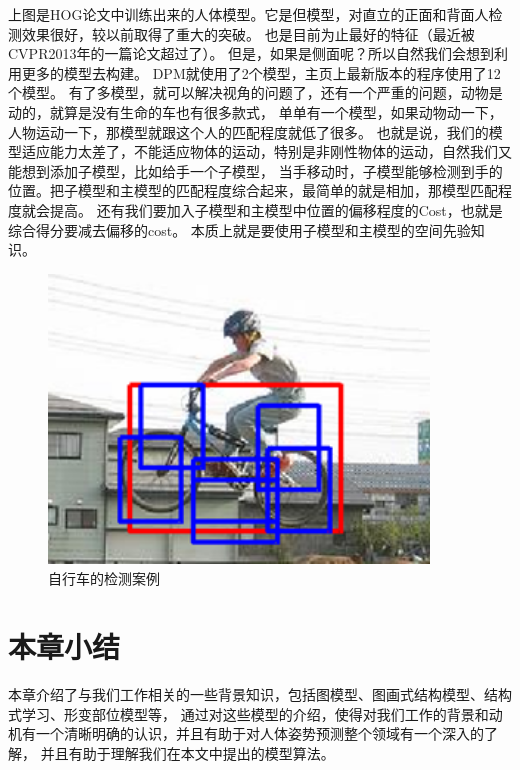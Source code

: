 上图是HOG论文中训练出来的人体模型。它是但模型，对直立的正面和背面人检测效果很好，较以前取得了重大的突破。
也是目前为止最好的特征（最近被CVPR2013年的一篇论文\cite{hsc}超过了）。
但是，如果是侧面呢？所以自然我们会想到利用更多的模型去构建。
DPM就使用了2个模型，主页上最新版本的程序使用了12个模型。
有了多模型，就可以解决视角的问题了，还有一个严重的问题，动物是动的，就算是没有生命的车也有很多款式，
单单有一个模型，如果动物动一下，人物运动一下，那模型就跟这个人的匹配程度就低了很多。
也就是说，我们的模型适应能力太差了，不能适应物体的运动，特别是非刚性物体的运动，自然我们又能想到添加子模型，比如给手一个子模型，
当手移动时，子模型能够检测到手的位置。把子模型和主模型的匹配程度综合起来，最简单的就是相加，那模型匹配程度就会提高。
还有我们要加入子模型和主模型中位置的偏移程度的Cost，也就是综合得分要减去偏移的cost。
本质上就是要使用子模型和主模型的空间先验知识。

\begin{figure}
\centering
\includegraphics[width=0.9\textwidth]{img/dpm1.png}
\caption{自行车的检测案例}
\label{fig:dpm1}
\end{figure}

\section{本章小结}
本章介绍了与我们工作相关的一些背景知识，包括图模型、图画式结构模型、结构式学习、形变部位模型等，
通过对这些模型的介绍，使得对我们工作的背景和动机有一个清晰明确的认识，并且有助于对人体姿势预测整个领域有一个深入的了解，
并且有助于理解我们在本文中提出的模型算法。
